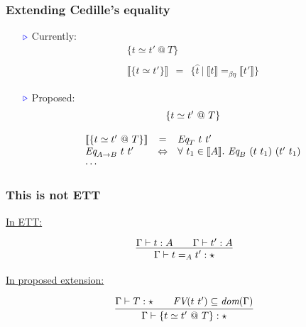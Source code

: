 \documentclass[11pt]{beamer}
\newcommand{\interp}[1]{\llbracket #1 \rrbracket}
\newcommand{\myb}[0]{\ensuremath{\textcolor{blue}{\triangleright}}}
\begin{document}
\begin{frame}
  \frametitle{Extending Cedille's equality}

  \begin{itemize}
    \item[$\myb$]
  Currently:
  \[
  \begin{array}{c}
    \{ t \simeq t'\ @\ T\} \\ \\
    \interp{\{ t \simeq t'\}} \ \ = \ \ \{ \hat{t}\ |\ \interp{t} =_{\beta\eta} \interp{t'} \}
    \end{array}
  \]

    \item[$\myb$]
  Proposed:
  \[
  \begin{array}{lcl}
    \multicolumn{3}{c}{\{ t \simeq t'\ @\ T\}} \\ \\
    \interp{\{ t \simeq t'\ @\ T\}} & = & \textit{Eq}_{T}\ t\ t' \\
    \textit{Eq}_{A\to B}\ t\ t' & \Leftrightarrow & \forall\ t_1\in\interp{A}.\ \textit{Eq}_{B}\ (t\ t_1)\ (t'\ t_1)\\
    \multicolumn{3}{l}{\cdots}
    \end{array}
    \]


\vspace{.5cm}

      \large\color{purple}

    
    \end{itemize}

\end{frame}

\begin{frame}
  \frametitle{This is not ETT}

  \underline{In ETT:}

  \[
  \infer{\Gamma\vdash t =_A t' : \star}{\Gamma\vdash t : A \qquad \Gamma\vdash t' : A}
  \]

\vspace{1cm}

  \underline{In proposed extension:}
  
  \[
  \infer{\Gamma\vdash \{ t \simeq t'\ @\ T \} : \star}{\Gamma\vdash T: \star \qquad \textit{FV}(t\ t')\subseteq\textit{dom}(\Gamma)}
  \]

  \end{frame}
\end{document}
